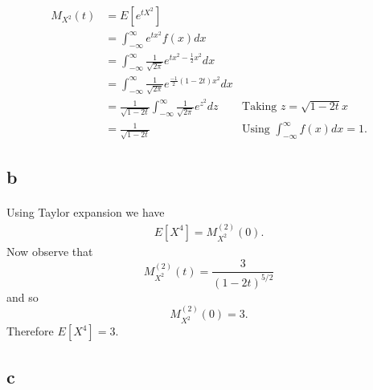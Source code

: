 \documentclass[letterpaper,12pt,oneside,onecolumn]{article}
\begin{document}
\paragraph{}
\begin{align*}
M_{X^2}(t) &= E[e^{tX^2}] \\
&= \int_{-\infty}^\infty e^{tx^2}f(x)dx \\
&=\int_{-\infty}^\infty \frac{1}{\sqrt{2\pi}}e^{tx^2-\frac{1}{2}x^2}dx \\
&= \int_{-\infty}^\infty \frac{1}{\sqrt{2\pi}}e^{\frac{-1}{2}(1-2t)x^2}dx \\
&= \frac{1}{\sqrt{1-2t}}\int_{-\infty}^\infty \frac{1}{\sqrt{2\pi}}e^{z^2}dz &\text{Taking $z=\sqrt{1-2t}x$} \\
&= \frac{1}{\sqrt{1-2t}} &\text{Using $\int_{-\infty}^\infty f(x)dx = 1$}.
\end{align*}
\subsection{b}
\paragraph{}
Using Taylor expansion we have
\begin{align*}
E[X^4] = M_{X^2}^{(2)}(0).
\end{align*}
Now observe that
$$M_{X^2}^{(2)}(t) = \frac{3}{(1-2t)^{5/2}}$$
and so
$$M_{X^2}^{(2)}(0) = 3.$$
Therefore $E[X^4] = 3$.
\subsection{c}
\end{document}
